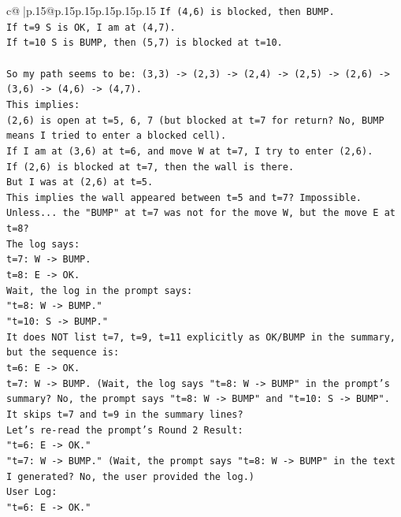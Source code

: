 \documentclass{article}
\begin{document}
{\begin{supertabular}{c@{$\;$}|p{.15\linewidth}@{}p{.15\linewidth}p{.15\linewidth}p{.15\linewidth}p{.15\linewidth}p{.15\linewidth}}
{{{\texttt{If (4,6) is blocked, then BUMP.} \\
\texttt{If t=9 S is OK, I am at (4,7).} \\
\texttt{If t=10 S is BUMP, then (5,7) is blocked at t=10.} \\
\\ 
\texttt{So my path seems to be: (3,3) {-}> (2,3) {-}> (2,4) {-}> (2,5) {-}> (2,6) {-}> (3,6) {-}> (4,6) {-}> (4,7).} \\
\texttt{This implies:} \\
\texttt{(2,6) is open at t=5, 6, 7 (but blocked at t=7 for return? No, BUMP means I tried to enter a blocked cell).} \\
\texttt{If I am at (3,6) at t=6, and move W at t=7, I try to enter (2,6).} \\
\texttt{If (2,6) is blocked at t=7, then the wall is there.} \\
\texttt{But I was at (2,6) at t=5.} \\
\texttt{This implies the wall appeared between t=5 and t=7? Impossible.} \\
\texttt{Unless... the "BUMP" at t=7 was not for the move W, but the move E at t=8?} \\
\texttt{The log says:} \\
\texttt{t=7: W {-}> BUMP.} \\
\texttt{t=8: E {-}> OK.} \\
\texttt{Wait, the log in the prompt says:} \\
\texttt{"t=8: W {-}> BUMP."} \\
\texttt{"t=10: S {-}> BUMP."} \\
\texttt{It does NOT list t=7, t=9, t=11 explicitly as OK/BUMP in the summary, but the sequence is:} \\
\texttt{t=6: E {-}> OK.} \\
\texttt{t=7: W {-}> BUMP. (Wait, the log says "t=8: W {-}> BUMP" in the prompt's summary? No, the prompt says "t=8: W {-}> BUMP" and "t=10: S {-}> BUMP". It skips t=7 and t=9 in the summary lines?} \\
\texttt{Let's re{-}read the prompt's Round 2 Result:} \\
\texttt{"t=6: E {-}> OK."} \\
\texttt{"t=7: W {-}> BUMP." (Wait, the prompt says "t=8: W {-}> BUMP" in the text I generated? No, the user provided the log.)} \\
\texttt{User Log:} \\
\texttt{"t=6: E {-}> OK."} \\
}}}
\end{supertabular}}
\end{document}
